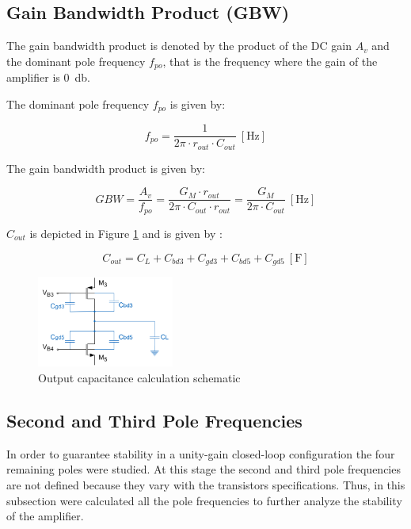\subsection{Gain Bandwidth Product (GBW)}
The gain bandwidth product is denoted by the product of the DC gain $A_v$ and the dominant pole frequency $f_{po}$, that is the frequency where the gain of the amplifier is \SI{0}{\decibel}. 

The dominant pole frequency $f_{po}$ is given by:

\begin{equation}
    f_{po} = \frac{1}{2\pi \cdot r_{out} \cdot C_{out}} \ [\si{\hertz}]
    \label{eq:fpo}
\end{equation}

The gain bandwidth product is given by:

\begin{equation}
    GBW = \frac{A_v}{f_{po}} = \frac{G_M \cdot r_{out}}{2\pi \cdot C_{out} \cdot r_{out}}=\frac{G_M}{2\pi \cdot C_{out}} \ [\si{\hertz}]
    \label{eq:GBW}
\end{equation}

$C_{out}$ is depicted in Figure \ref{fig:cout_sch} and is given by :

\begin{equation}
    C_{out} = C_L + C_{bd3} + C_{gd3} + C_{bd5} + C_{gd5} \ [\si{\farad}]
    \label{eq:cout}
\end{equation}

\begin{figure}[H]
    \centering
    \includegraphics[width=0.4\textwidth]{Images/Cout_sch.png}
    \caption{Output capacitance calculation schematic}
    \label{fig:cout_sch}
\end{figure}

\subsection{Second and Third Pole Frequencies}
In order to guarantee stability in a unity-gain closed-loop configuration the four remaining poles were studied. At this stage the second and third pole frequencies are not defined because they vary with the transistors specifications. Thus, in this subsection were calculated all the pole frequencies to further analyze the stability of the amplifier. 

